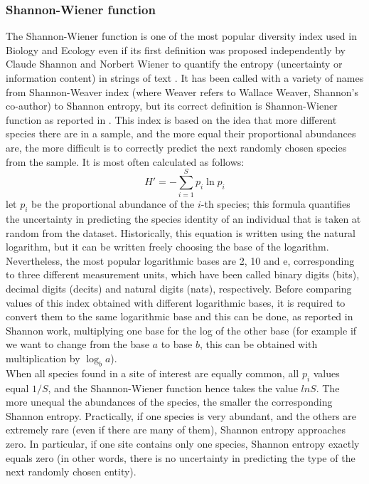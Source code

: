 \subsubsection*{Shannon-Wiener function}
The Shannon-Wiener function is one of the most popular diversity index used in Biology and Ecology even if its first definition was proposed independently by Claude Shannon and Norbert Wiener to quantify the entropy (uncertainty or information content) in strings of text \citep{shannon1949mathematical, wiener1948cybernetics}. It has been called with a variety of names from Shannon-Weaver index (where Weaver refers to Wallace Weaver, Shannon's co-author) to Shannon entropy, but its correct definition is Shannon-Wiener function as reported in \citep{krebsj}. This index is based on the idea that more different species there are in a sample, and the more equal their proportional abundances are, the more difficult is to correctly predict the next randomly chosen species from the sample. It is most often calculated as follows:
\begin{equation*}
H' = -\sum_{i=1}^S p_i \ln p_i
\end{equation*}
let $p_i$ be the proportional abundance of the $i$-th species; this formula quantifies the uncertainty in predicting the species identity of an individual that is taken at random from the dataset. Historically, this equation is written using the natural logarithm, but it can be written freely choosing the base of the logarithm. Nevertheless, the most popular logarithmic bases are 2, 10 and e, corresponding to three different measurement units, which have been called binary digits (bits), decimal digits (decits) and natural digits (nats), respectively. Before comparing values of this index obtained with different logarithmic bases, it is required to convert them to the same logarithmic base and this can be done, as reported in Shannon work, multiplying one base for the log of the other base (for example if we want to change from the base $a$ to base $b$, this can be obtained with multiplication by $\log_{b}a$).\\
When all species found in a site of interest are equally common, all $p_i$ values equal $1/S$, and the Shannon-Wiener function hence takes the value $ln S$. The more unequal the abundances of the species, the smaller the corresponding Shannon entropy. Practically, if one species is very abundant, and the others are extremely rare (even if there are many of them), Shannon entropy approaches zero. In particular, if one site contains only one species, Shannon entropy exactly equals zero (in other words, there is no uncertainty in predicting the type of the next randomly chosen entity).\\
